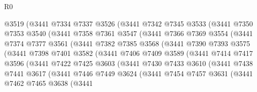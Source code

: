 \begin{lexlean}{R0}
\begin{coremodule}
              @3519
              (@3441
                @7334
                @7337
                @3526
                (@3441
                  @7342
                  @7345
                  @3533
                  (@3441
                    @7350
                    @7353
                    @3540
                    (@3441
                      @7358
                      @7361
                      @3547
                      (@3441
                        @7366
                        @7369
                        @3554
                        (@3441
                          @7374
                          @7377
                          @3561
                          (@3441
                            @7382
                            @7385
                            @3568
                            (@3441
                              @7390
                              @7393
                              @3575
                              (@3441
                                @7398
                                @7401
                                @3582
                                (@3441
                                  @7406
                                  @7409
                                  @3589
                                  (@3441
                                    @7414
                                    @7417
                                    @3596
                                    (@3441
                                      @7422
                                      @7425
                                      @3603
                                      (@3441
                                        @7430
                                        @7433
                                        @3610
                                        (@3441
                                          @7438
                                          @7441
                                          @3617
                                          (@3441
                                            @7446
                                            @7449
                                            @3624
                                            (@3441
                                              @7454
                                              @7457
                                              @3631
                                              (@3441
                                                @7462
                                                @7465
                                                @3638
                                                (@3441

\end{coremodule}
\end{lexlean}

